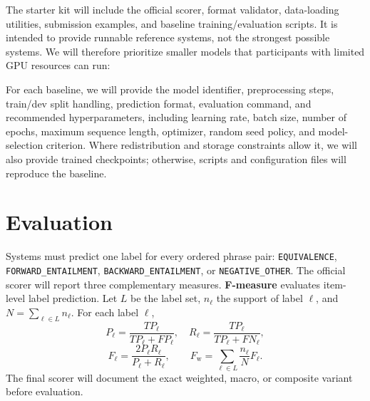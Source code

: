 \documentclass[11pt]{article}
\begin{document}
The starter kit will include the official scorer, format validator, data-loading utilities, submission examples, and baseline training/evaluation scripts.
It is intended to provide runnable reference systems, not the strongest possible systems.
We will therefore prioritize smaller models that participants with limited GPU resources can run:

\begin{table}[h]
\centering
\scriptsize
\setlength{\tabcolsep}{3pt}
\caption{Planned starter-kit baselines.}
\label{tab:starter}
\end{table}

For each baseline, we will provide the model identifier, preprocessing steps, train/dev split handling, prediction format, evaluation command, and recommended hyperparameters, including learning rate, batch size, number of epochs, maximum sequence length, optimizer, random seed policy, and model-selection criterion.
Where redistribution and storage constraints allow it, we will also provide trained checkpoints; otherwise, scripts and configuration files will reproduce the baseline.

\section{Evaluation}

Systems must predict one label for every ordered phrase pair:
\texttt{EQUIVALENCE}, \texttt{FORWARD\_ENTAILMENT}, \texttt{BACKWARD\_ENTAILMENT}, or \texttt{NEGATIVE\_OTHER}.
The official scorer will report three complementary measures.
\textbf{F-measure} evaluates item-level label prediction.
Let \(L\) be the label set, \(n_\ell\) the support of label \(\ell\), and \(N=\sum_{\ell \in L}n_\ell\).
For each label \(\ell\),
\[
  P_\ell=\frac{TP_\ell}{TP_\ell+FP_\ell}, \quad
  R_\ell=\frac{TP_\ell}{TP_\ell+FN_\ell},
\]
\[
  F_\ell=\frac{2P_\ell R_\ell}{P_\ell+R_\ell}, \qquad
  F_{\mathrm{w}}=\sum_{\ell \in L}\frac{n_\ell}{N}F_\ell .
\]
The final scorer will document the exact weighted, macro, or composite variant before evaluation.
\end{document}
